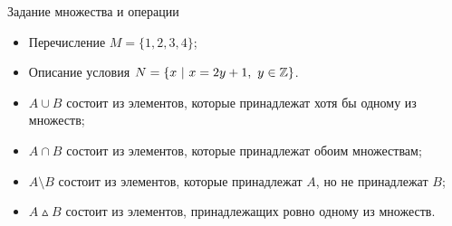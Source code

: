 \begin{frame}{Задание множества и операции}


\begin{itemize}

\item Перечисление $M=\{1,2,3,4\}$;

\item Описание условия $N=\{ x \ |\ x=2y+1, \ y\in \ZZ\}$.

\end{itemize}


\begin{itemize}

\item  {} $A \cup B$ состоит из элементов, которые
принадлежат хотя бы одному из множеств;

\item {} $A \cap B$ состоит из элементов, которые принадлежат обоим множествам;

\item {} $A \setminus B$ состоит из элементов, которые принадлежат $A$, но
не принадлежат $B$;

\item {} $A\vartriangle B$ состоит из элементов, принадлежащих ровно одному из множеств.

\end{itemize}

\end{frame}


